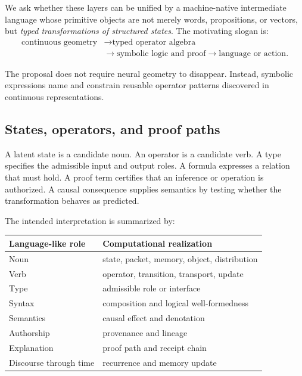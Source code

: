 \documentclass[11pt]{article}
\theoremstyle{definition}
\theoremstyle{remark}
\begin{document}
We ask whether these layers can be unified by a machine-native intermediate language whose primitive objects are not merely words, propositions, or vectors, but \emph{typed transformations of structured states}. The motivating slogan is:
\begin{equation}
\boxed{
\begin{aligned}
\text{continuous geometry}
&\longrightarrow
\text{typed operator algebra}\\
&\longrightarrow
\text{symbolic logic and proof}
\longrightarrow
\text{language or action}.
\end{aligned}
}
\label{eq:stack}
\end{equation}

The proposal does not require neural geometry to disappear. Instead, symbolic expressions name and constrain reusable operator patterns discovered in continuous representations.

\subsection{States, operators, and proof paths}

A latent state is a candidate noun. An operator is a candidate verb. A type specifies the admissible input and output roles. A formula expresses a relation that must hold. A proof term certifies that an inference or operation is authorized. A causal consequence supplies semantics by testing whether the transformation behaves as predicted.

The intended interpretation is summarized by:
\begin{center}
\begin{tabular}{ll}
\toprule
Language-like role & Computational realization \\
\midrule
Noun & state, packet, memory, object, distribution \\
Verb & operator, transition, transport, update \\
Type & admissible role or interface \\
Syntax & composition and logical well-formedness \\
Semantics & causal effect and denotation \\
Authorship & provenance and lineage \\
Explanation & proof path and receipt chain \\
Discourse through time & recurrence and memory update \\
\bottomrule
\end{tabular}
\end{center}
\end{document}
